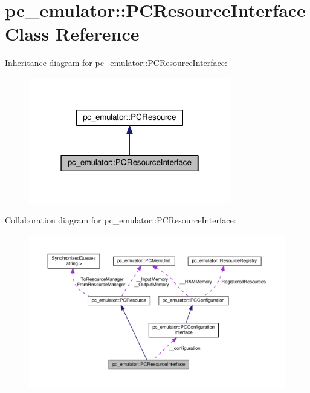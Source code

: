 \hypertarget{classpc__emulator_1_1PCResourceInterface}{}\section{pc\+\_\+emulator\+:\+:P\+C\+Resource\+Interface Class Reference}
\label{classpc__emulator_1_1PCResourceInterface}


Inheritance diagram for pc\+\_\+emulator\+:\+:P\+C\+Resource\+Interface\+:\nopagebreak
\begin{figure}[H]
\begin{center}
\leavevmode
\includegraphics[width=250pt]{classpc__emulator_1_1PCResourceInterface__inherit__graph}
\end{center}
\end{figure}


Collaboration diagram for pc\+\_\+emulator\+:\+:P\+C\+Resource\+Interface\+:\nopagebreak
\begin{figure}[H]
\begin{center}
\leavevmode
\includegraphics[width=350pt]{classpc__emulator_1_1PCResourceInterface__coll__graph}
\end{center}
\end{figure}
